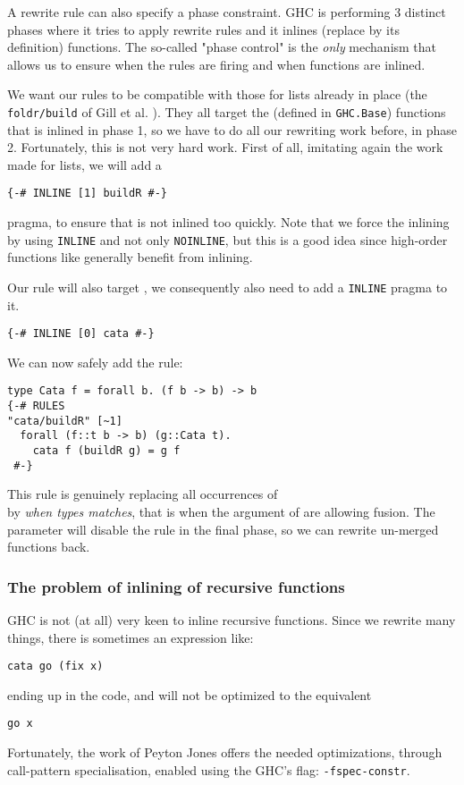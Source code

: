 A rewrite rule can also specify a phase constraint. GHC is performing 3 distinct phases where it tries to apply rewrite rules and it inlines (replace by its definition) functions. The so-called "phase control" is the \emph{only} mechanism that allows us to ensure when the rules are firing and when functions are inlined.

We want our rules to be compatible with those for lists already in place (the \verb|foldr/build| of Gill et al. \cite{Gill:1993:SCD:165180.165214}). They all target the  (defined in \verb|GHC.Base|) functions that is inlined in phase 1, so we have to do all our rewriting work before, in phase 2. Fortunately, this is not very hard work. First of all, imitating again the work made for lists, we will add a
\begin{verbatim}
{-# INLINE [1] buildR #-}
\end{verbatim}
pragma, to ensure that  is not inlined too quickly. Note that we force the inlining by using \verb|INLINE| and not only \verb|NOINLINE|, but this is a good idea since high-order functions like  generally benefit from inlining.

Our rule will also target , we consequently also need to add a \verb|INLINE| pragma to it.
\begin{verbatim}
{-# INLINE [0] cata #-}
\end{verbatim}

\noindent We can now safely add the rule:
\begin{verbatim}
type Cata f = forall b. (f b -> b) -> b
{-# RULES
"cata/buildR" [~1]
  forall (f::t b -> b) (g::Cata t).
    cata f (buildR g) = g f
 #-}
\end{verbatim}
This rule is genuinely replacing all occurrences of\\  by  \emph{when types matches}, that is when the argument of  are allowing fusion. The \minline{[~1]} parameter will disable the rule in the final phase, so we can rewrite un-merged functions back.

\subsubsection{The problem of inlining of recursive functions}
GHC is not (at all) very keen to inline recursive functions. Since we rewrite many things, there is sometimes an expression like:
\begin{verbatim}
cata go (fix x)
\end{verbatim}
ending up in the code, and will not be optimized to the equivalent
\begin{verbatim}
go x
\end{verbatim}
Fortunately, the work of Peyton Jones \cite{PeytonJones:2007:CSH:1291151.1291200} offers the needed optimizations, through call-pattern specialisation, enabled using the GHC's flag: \verb|-fspec-constr|.

